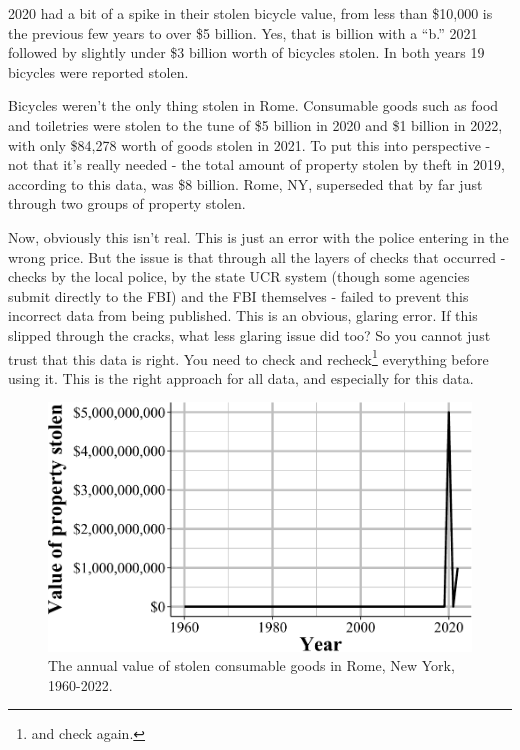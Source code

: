\documentclass[
  12pt,
  openany]{book}
\begin{document}
2020 had a bit of a spike in their stolen bicycle value, from less than \$10,000 is the previous few years to over \$5 billion. Yes, that is billion with a ``b.'' 2021 followed by slightly under \$3 billion worth of bicycles stolen. In both years 19 bicycles were reported stolen.

Bicycles weren't the only thing stolen in Rome. Consumable goods such as food and toiletries were stolen to the tune of \$5 billion in 2020 and \$1 billion in 2022, with only \$84,278 worth of goods stolen in 2021. To put this into perspective - not that it's really needed - the total amount of property stolen by theft in 2019, according to this data, was \$8 billion. Rome, NY, superseded that by far just through two groups of property stolen.

Now, obviously this isn't real. This is just an error with the police entering in the wrong price. But the issue is that through all the layers of checks that occurred - checks by the local police, by the state UCR system (though some agencies submit directly to the FBI) and the FBI themselves - failed to prevent this incorrect data from being published. This is an obvious, glaring error. If this slipped through the cracks, what less glaring issue did too? So you cannot just trust that this data is right. You need to check and recheck\footnote{and check again.} everything before using it. This is the right approach for all data, and especially for this data.

\begin{figure}

{\centering \includegraphics[width=0.9\linewidth]{04_stolen_property_files/figure-latex/romeConsumable-1} 

}

\caption{The annual value of stolen consumable goods in Rome, New York, 1960-2022.}\label{fig:romeConsumable}
\end{figure}
\end{document}
